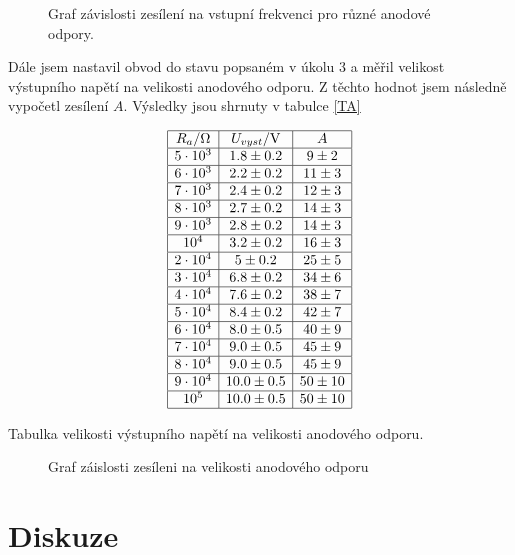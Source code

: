 \documentclass[a4paper,12pt]{article}
\begin{document}
\begin{figure}

\caption{Graf závislosti zesílení na vstupní frekvenci pro různé anodové odpory.}
\label{g2}
\end{figure}

Dále jsem nastavil obvod do stavu popsaném v úkolu 3 a měřil velikost výstupního napětí na velikosti anodového odporu. 
Z těchto hodnot jsem následně vypočetl zesílení $A$. Výsledky jsou shrnuty v tabulce \ref{TA}

\begin{table}
$$
\begin{array}{|c|c|c|}
\hline
R_a/\Omega& U_{vyst}/\mbox{V}&  A \\  \hline
5\cdot 10^3&    1.8\pm 0.2&    9\pm2  \\  \hline
6\cdot 10^3&    2.2\pm 0.2&    11\pm3  \\ \hline
7\cdot 10^3&    2.4\pm 0.2&    12\pm3  \\ \hline
8\cdot 10^3&    2.7\pm 0.2&    14\pm3 \\   \hline
9\cdot 10^3&    2.8\pm 0.2&    14\pm3  \\ \hline
10^4&   3.2\pm 0.2&    16\pm3 \\  \hline
2\cdot 10^4&    5\pm 0.2&  25\pm5 \\ \hline
3\cdot 10^4&    6.8\pm 0.2&    34\pm6 \\ \hline
4\cdot 10^4&    7.6\pm 0.2&    38\pm7 \\ \hline
5\cdot 10^4&    8.4\pm 0.2&    42\pm7 \\ \hline
6\cdot 10^4&    8.0 \pm 0.5&    40\pm9 \\ \hline
7\cdot 10^4&    9.0\pm 0.5 &  45\pm9 \\ \hline
8\cdot 10^4&    9.0\pm 0.5& 45\pm9 \\ \hline
9\cdot 10^4&    10.0\pm 0.5&    50\pm10 \\ \hline
10^5&   10.0\pm 0.5&    50\pm10 \\  \hline
\end{array}
$$
\caption{Tabulka velikosti výstupního napětí na velikosti anodového odporu.}
\label{TA}
\end{table}

\begin{figure}

\caption{Graf záislosti zesíleni na velikosti anodového odporu}
\label{g3}
\end{figure}


\eject
\section{Diskuze}
\end{document}
